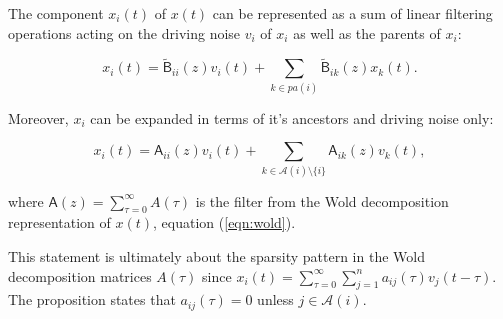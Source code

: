 \documentclass[12pt]{article}
\def\B{\mathsf{B}}  %
\def\wtB{\widetilde{\B}}  %
\def\A{\mathsf{A}}  %
\newcommand{\pa}[1]{pa(#1)}  %
\newcommand{\anc}[1]{\mathcal{A}(#1)}  %
\newcommand{\ancn}[2]{\mathcal{A}_{#1}(#2)}  %
\newcommand{\gpn}[2]{gp_{#1}(#2)}  %
\begin{document}
\begin{proposition}
  \label{prop:parent_expanding}
  The component $x_i(t)$ of $x(t)$ can be represented as a sum of
  linear filtering operations acting on the driving noise $v_i$ of
  $x_i$ as well as the parents of $x_i$:

  \begin{equation}
    \label{eqn:parent_expansion}
    x_i(t) = \wtB_{ii}(z)v_i(t) + \sum_{k \in \pa{i}}\wtB_{ik}(z)x_k(t).
  \end{equation}

  Moreover, $x_i$ can be expanded in terms of it's ancestors and
  driving noise only:

  \begin{equation}
    x_i(t) = \A_{ii}(z)v_i(t) + \sum_{k \in \anc{i} \setminus\{i\}}\A_{ik}(z)v_k(t),
  \end{equation}

  where $\A(z) = \sum_{\tau = 0}^\infty A(\tau)$ is the filter from
  the Wold decomposition representation of $x(t)$, equation
  (\ref{eqn:wold}).
\end{proposition}

This statement is ultimately about the sparsity pattern in the Wold
decomposition matrices $A(\tau)$ since
$x_i(t) = \sum_{\tau = 0}^\infty \sum_{j = 1}^n a_{ij}(\tau)v_j(t -
\tau)$.  The proposition states that $a_{ij}(\tau) = 0$ unless
$j \in \anc{i}$.




\end{document}
